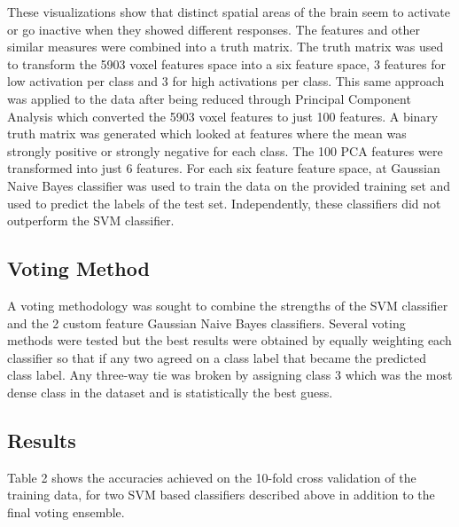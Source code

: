 \documentclass{article} %
\begin{document}
These visualizations show that distinct spatial areas of the brain seem to activate or go inactive when they showed different responses.  The features and other similar measures were combined into a truth matrix. The truth matrix was used to transform the 5903 voxel features space into a six feature space, 3 features for low activation per class and 3 for high activations per class.
This same approach was applied to the data after being reduced through Principal Component Analysis which converted the 5903 voxel features to just 100 features.  A binary truth matrix was generated which looked at features where the mean was strongly positive or strongly negative for each class. The 100 PCA features were transformed into just 6 features.
For each six feature feature space, at Gaussian Naive Bayes classifier was used to train the data on the provided training set and used to predict the labels of the test set. Independently, these classifiers did not outperform the SVM classifier.

\subsection{Voting Method}
A voting methodology was sought to combine the strengths of the SVM classifier and the 2 custom feature Gaussian Naive Bayes classifiers. Several voting methods were tested but the best results were obtained by equally weighting each classifier so that if any two agreed on a class label that became the predicted class label. Any three-way tie was broken by assigning class 3 which was the most dense class in the dataset and is statistically the best guess.
\subsection{Results}

Table 2 shows the accuracies achieved on the 10-fold cross validation of the training data, for two SVM based classifiers described above in addition to the final voting ensemble.
\end{document}
